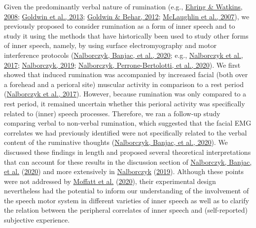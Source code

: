 \documentclass[
  english,
  man, donotrepeattitle,floatsintext]{apa6}
\begin{document}
Given the predominantly verbal nature of rumination (e.g., \protect\hyperlink{ref-ehring_repetitive_2008}{Ehring \& Watkins, 2008}; \protect\hyperlink{ref-goldwin_concreteness_2013}{Goldwin et al., 2013}; \protect\hyperlink{ref-goldwin_concreteness_2012}{Goldwin \& Behar, 2012}; \protect\hyperlink{ref-mclaughlin_effects_2007}{McLaughlin et al., 2007}), we previously proposed to consider rumination as a form of inner speech and to study it using the methods that have historically been used to study other forms of inner speech, namely, by using surface electromyography and motor interference protocols (\protect\hyperlink{ref-nalborczyk_dissociating_2020}{Nalborczyk, Banjac, et al., 2020}; e.g., \protect\hyperlink{ref-nalborczyk_orofacial_2017}{Nalborczyk et al., 2017}; \protect\hyperlink{ref-nalborczyk_understanding_2019}{Nalborczyk, 2019}; \protect\hyperlink{ref-nalborczyk_articulatory_2020}{Nalborczyk, Perrone-Bertolotti, et al., 2020}). We first showed that induced rumination was accompanied by increased facial (both over a forehead and a perioral site) muscular activity in comparison to a rest period (\protect\hyperlink{ref-nalborczyk_orofacial_2017}{Nalborczyk et al., 2017}). However, because rumination was only compared to a rest period, it remained uncertain whether this perioral activity was specifically related to (inner) speech processes. Therefore, we ran a follow-up study comparing verbal to non-verbal rumination, which suggested that the facial EMG correlates we had previously identified were not specifically related to the verbal content of the ruminative thoughts (\protect\hyperlink{ref-nalborczyk_dissociating_2020}{Nalborczyk, Banjac, et al., 2020}). We discussed these findings in length and proposed several theoretical interpretations that can account for these results in the discussion section of \protect\hyperlink{ref-nalborczyk_dissociating_2020}{Nalborczyk, Banjac, et al.} (\protect\hyperlink{ref-nalborczyk_dissociating_2020}{2020}) and more extensively in \protect\hyperlink{ref-nalborczyk_understanding_2019}{Nalborczyk} (\protect\hyperlink{ref-nalborczyk_understanding_2019}{2019}). Although these points were not addressed by \protect\hyperlink{ref-moffatt_inner_2020}{Moffatt et al.} (\protect\hyperlink{ref-moffatt_inner_2020}{2020}), their experimental design nevertheless had the potential to inform our understanding of the involvement of the speech motor system in different varieties of inner speech as well as to clarify the relation between the peripheral correlates of inner speech and (self-reported) subjective experience.
\end{document}
